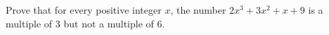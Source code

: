Prove that for every positive integer $x$, the number $2x^3+3x^2+x+9$ is a multiple of $3$ but not a multiple of $6$.
